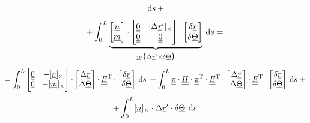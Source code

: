 \begin{frame}
\begin{displaymath}
    \: \dif s \: +
  \end{displaymath}
  \begin{displaymath}
   +\int_0^L
      \underbrace{
      \begin{bmatrix}
        \underline{n} \\ \underline{m}
      \end{bmatrix} \cdot
      \begin{bmatrix}
        \doubleunderline{0} & [ \Delta \underline{r}^{\prime} ]_{\times} \\
        \doubleunderline{0} & \doubleunderline{0}
      \end{bmatrix} \cdot
      \begin{bmatrix}
        \delta \underline{r} \\ \delta \underline{\Theta}
      \end{bmatrix}
      }_{
        \underline{n} \cdot \bigl( \Delta \underline{r}^{\prime} \times \delta \underline{\Theta} \bigr)
      }
    \: \dif s =
  \end{displaymath}
  \begin{displaymath}
    = \int_0^L
      \begin{bmatrix}
        \doubleunderline{0} & - [ \underline{n} ]_{\times} \\
        \doubleunderline{0} & - [ \underline{m} ]_{\times}
      \end{bmatrix} \cdot
      \begin{bmatrix}
        \Delta \underline{r} \\
        \Delta \underline{\Theta}
      \end{bmatrix} \cdot
      \doubleunderline{E}^{\mathrm{T}} \cdot
      \begin{bmatrix}
        \delta \underline{r} \\ \delta \underline{\Theta}
      \end{bmatrix}
    \: \dif s \:
    + \int_0^L
      \doubleunderline{\pi} \cdot
      \doubleunderline{H} \cdot
      \doubleunderline{\pi}^{\mathrm{T}} \cdot
      \doubleunderline{E}^{\mathrm{T}} \cdot
      \begin{bmatrix}
        \Delta \underline{r} \\
        \Delta \underline{\Theta}
      \end{bmatrix} \cdot
      \doubleunderline{E}^{\mathrm{T}} \cdot
      \begin{bmatrix}
        \delta \underline{r} \\ \delta \underline{\Theta}
      \end{bmatrix}
    \: \dif s \: +
  \end{displaymath}
  \begin{displaymath}
   + \int_0^L
      [ \underline{n} ]_{\times} \cdot \Delta \underline{r}^{\prime} \cdot \delta \underline{\Theta}
    \: \dif s
  \end{displaymath}

\end{frame}


